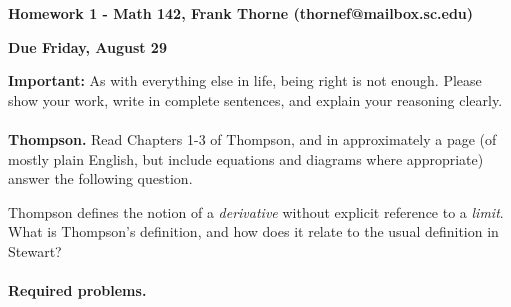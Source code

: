 \documentclass[12pt]{article}
\begin{document}
\setlength{\topmargin}{-2mm}





\begin{center}{\bf Homework 1 - Math 142, Frank Thorne (thornef@mailbox.sc.edu)}
\end{center}
\begin{center}
{\bf Due Friday, August 29}
\end{center}

{\bf Important:} As with everything else in life, being right is not enough.
Please show your work, write in complete sentences, and explain your reasoning clearly. 
\\
\\
{\bf Thompson.}
Read Chapters 1-3 of Thompson, and in approximately a page (of mostly plain English, but include
equations and diagrams where appropriate) answer the following question.

Thompson defines the notion of a {\itshape derivative} without explicit reference to a
{\itshape limit}. What is Thompson's definition, and how does it relate to the usual
definition in Stewart?
\\
\\
{\bf Required problems.}
\end{document}
